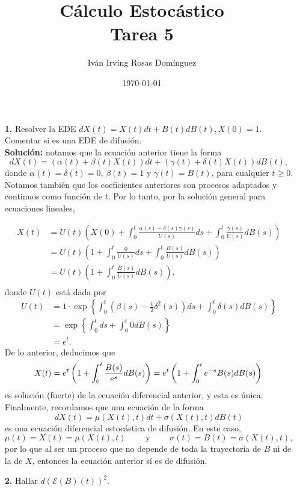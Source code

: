 \documentclass[letterpaper]{article}
\title{\textbf{Cálculo Estocástico\\
Tarea 5}}
\author{Iván Irving Rosas Domínguez}
\date{\today}
\newcommand{\1}{\mathds{1}}
\theoremstyle{definition}
\theoremstyle{definition}
\theoremstyle{definition}
\theoremstyle{definition}
\theoremstyle{definition}
\begin{document}
\maketitle


\begin{itemize}
    \item[\textbf{1.}] Resolver la EDE $dX(t)=X(t)dt+B(t)dB(t), X(0)=1$. Comentar si es 
    una EDE de difusión.\\

    \textbf{Solución:} notamos que la ecuación anterior tiene la forma
    \[
    dX(t)=\left(\alpha(t)+\beta(t)X(t)\right)dt+\left(\gamma(t)+\delta(t)X(t)\right)dB(t),    
    \]
    donde $\alpha(t)=\delta(t)=0$, $\beta(t)=1$ y $\gamma(t)=B(t)$, para cualquier $t\geq0$. Notamos 
    también que los coeficientes anteriores son procesos adaptados y continuos como función 
    de $t$. Por lo tanto, por la solución general para ecuaciones lineales, 
    
    \begin{align*}
        X(t)&=U(t)\left(X(0)+\int_{0}^{t}\frac{\alpha(s)-\delta(s)\gamma(s)}{U(s)}ds + \int_{0}^{t}\frac{\gamma(s)}{U(s)}dB(s)\right)\\
        &=U(t)\left(1+\int_{0}^{t}\frac{0}{U(s)}ds + \int_{0}^{t}\frac{B(s)}{U(s)}dB(s)\right)\\
        &=U(t)\left(1+\int_{0}^{t}\frac{B(s)}{U(s)}dB(s)\right),\\
    \end{align*}
    donde $U(t)$ está dada por
    \begin{align*}
        U(t)&=1\cdot\exp \left\{\int_{0}^{t}(\beta(s)-\frac{1}{2}\delta^2(s))ds+\int_{0}^{t}\delta(s)dB(s)\right\}\\
        &=\exp \left\{\int_{0}^{t}ds+\int_{0}^{t}0dB(s)\right\}\\
        &=e^{t}.
    \end{align*}
    De lo anterior, deducimos que 
    \[
    X(t)=e^{t}\left(1+\int_{0}^{t}\frac{B(s)}{e^{s}}dB(s)\right)=e^{t}\left(1+\int_{0}^{t}e^{-s}B(s)dB(s)\right)\\
    \]
    es solución (fuerte) de la ecuación diferencial anterior, y esta es única. Finalmente, recordamos 
    que una ecuación de la forma 
    \[
    dX(t) = \mu(X(t), t)dt + \sigma(X(t), t)dB(t)
    \]
    es una ecuación diferencial estocástica de difusión. En este caso,
    \[
    \mu(t)=X(t)=\mu(X(t),t) \qquad \text{ y } \qquad \sigma(t)=B(t)=\sigma(X(t),t),    
    \]
    por lo que al ser un proceso que no depende de toda la trayectoria de $B$ ni de la de $X$,
    entonces la ecuación anterior sí es de difusión. 
    \item[\textbf{2.}] Hallar $d\left(\mathcal{E}(B)(t)\right)^2.$\\
    

\end{itemize}
\end{document}

